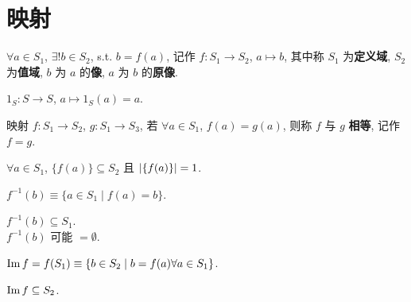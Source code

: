 \documentclass{note}
\begin{document}
\section{映射}
\begin{df}[映射]
    $\forall a\in S_1$, $\exists!b\in S_2$, s.t. $b=f(a)$, 记作 $f:S_1\rightarrow S_2$, $a\mapsto b$, 其中称 $S_1$ 为\textbf{定义域}, $S_2$ 为\textbf{值域}, $b$ 为 $a$ 的\textbf{像}, $a$ 为 $b$ 的\textbf{原像}.
\end{df}

\begin{eg}[恒等映射]
    $1_S:S\rightarrow S$, $a\mapsto 1_S(a)=a$.
\end{eg}

\begin{df}[映射相等]
    映射 $f:S_1\rightarrow S_2$, $g:S_1\rightarrow S_3$, 若 $\forall a\in S_1$, $f(a)=g(a)$, 则称 $f$ 与 $g$ \textbf{相等}, 记作 $f=g$.
\end{df}

$\forall a\in S_1$, $\{f(a)\}\subseteq S_2$ 且 $\left\lvert\{f(a)\}\right\rvert=1$.

\begin{df}[原像集]
    $f^{-1}(b)\equiv\{a\in S_1\mid f(a)=b\}$.
\end{df}

$f^{-1}(b)\subseteq S_1$.\\
$f^{-1}(b)$ 可能 $=\emptyset$.

\begin{df}[像集]
    $\operatorname{Im} f=f(S_1)\equiv\{b\in S_2\mid b=f(a)\forall a\in S_1\}$.
\end{df}

$\operatorname{Im} f\subseteq S_2$.
\end{document}
